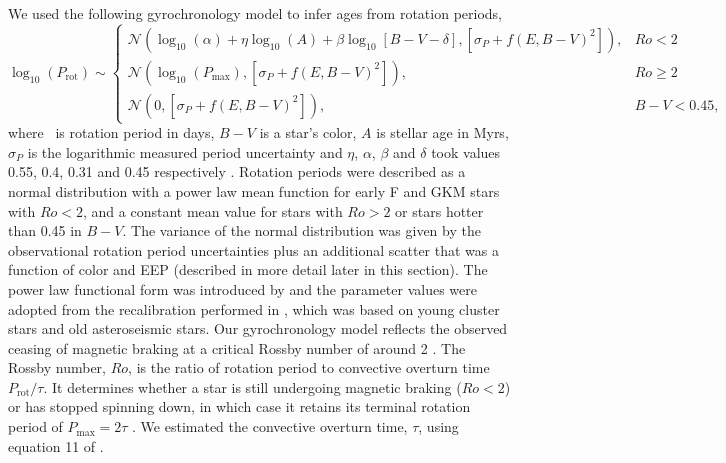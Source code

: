 We used the following gyrochronology model to infer ages from rotation
periods,
\begin{equation}
    \log_{10}(P_\mathrm{rot}) \sim \begin{cases}
        \mathcal{N}(\log_{10}(\alpha) + \eta \log_{10}(A) + \beta \log_{10}[B-V
        - \delta], [\sigma_P+f(E, B-V)^2]), & Ro < 2 \\
        \mathcal{N}(\log_{10}(P_\mathrm{max}), [\sigma_P+f(E, B-V)^2]),& Ro \geq 2 \\
        \mathcal{N}(0, [\sigma_P+f(E, B-V)^2]),& B-V < 0.45,
    \end{cases}
\label{eqn:gyro}
\end{equation}
where \prot\ is rotation period in days, $B-V$ is a star's color, $A$ is
stellar age in Myrs, $\sigma_P$ is the logarithmic measured  period
uncertainty and $\eta$, $\alpha$, $\beta$ and $\delta$ took values
0.55, 0.4, 0.31 and 0.45 respectively \citep{angus2015}.
Rotation periods were described as a normal distribution with a power law mean
function for early F and GKM stars with $Ro < 2$, and a constant mean value
for stars with $Ro > 2$ or stars hotter than 0.45 in $B-V$.
The variance of the normal distribution was given by the observational
rotation period uncertainties plus an additional scatter that was a function
of color and EEP (described in more detail later in this section).
The power law functional form was introduced by \citep{barnes2003} and the
parameter values were adopted from the recalibration performed in
\citet{angus2015}, which was based on young cluster stars and old
asteroseismic stars.
Our gyrochronology model reflects the observed ceasing of magnetic braking at
a critical Rossby number of around 2 \citep{vansaders2016}.
The Rossby number, $Ro$, is the ratio of rotation period to convective
overturn time $P_{\mathrm{rot}}/\tau$.
It determines whether a star is still undergoing magnetic braking ($Ro < 2$)
or has stopped spinning down, in which case it retains its terminal rotation
period of $P_\mathrm{max} = 2\tau$ \citep{vansaders2016}.
We estimated the convective overturn time, $\tau$, using equation 11 of
\citet{wright2011}.

